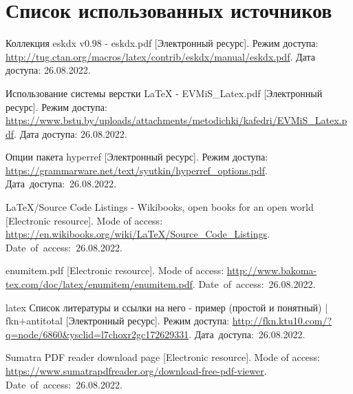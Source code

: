 \newpage
\begingroup
  \section*{Список использованных источников}

  \renewcommand{\addcontentsline}[3]{}%
  \renewcommand{\section}[2]{}%

  \begin{thebibliography}{}
    Коллекция eskdx v0.98 - eskdx.pdf
    [Электронный ресурс].
    Режим доступа: \url{http://tug.ctan.org/macros/latex/contrib/eskdx/manual/eskdx.pdf}.
    Дата доступа: 26.08.2022.
  
    Использование системы верстки LaTeX - EVMiS\_Latex.pdf
    [Электронный ресурс].
    Режим доступа: \url{https://www.bstu.by/uploads/attachments/metodichki/kafedri/EVMiS_Latex.pdf}.
    Дата доступа: 26.08.2022.
  
    Опции пакета hyperref
    [Электронный ресурс].
    Режим доступа: \url{https://grammarware.net/text/syutkin/hyperref_options.pdf}.
    Дата~доступа:~26.08.2022.
  
    LaTeX/Source Code Listings - Wikibooks, open books for an open world
    [Electronic resource].
    Mode of access: \url{https://en.wikibooks.org/wiki/LaTeX/Source_Code_Listings}.
    Date~of~access:~26.08.2022.
  
    enumitem.pdf
    [Electronic resource].
    Mode of access: \url{http://www.bakoma-tex.com/doc/latex/enumitem/enumitem.pdf}.
    Date~of~access:~26.08.2022.
  
    latex Список литературы и ссылки на него - пример (простой и понятный) | fkn+antitotal
    [Электронный ресурс].
    Режим доступа: \url{http://fkn.ktu10.com/?q=node/6860&ysclid=l7choxr2gc172629331}.
    Дата~доступа:~26.08.2022.
  
    Sumatra PDF reader download page
    [Electronic resource].
    Mode of access: \url{https://www.sumatrapdfreader.org/download-free-pdf-viewer}.
    Date~of~access:~26.08.2022.
  

\end{thebibliography}

